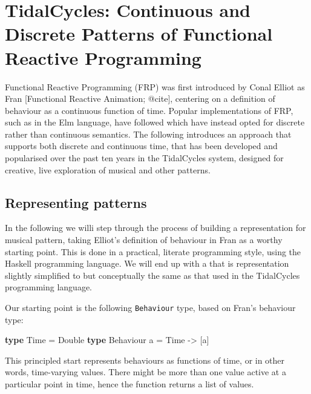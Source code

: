\documentclass[
]{article}
\author{}
\date{}
\newenvironment{Shaded}{}{}
\newcommand{\DataTypeTok}[1]{\textcolor[rgb]{0.56,0.13,0.00}{#1}}
\newcommand{\KeywordTok}[1]{\textcolor[rgb]{0.00,0.44,0.13}{\textbf{#1}}}
\newcommand{\NormalTok}[1]{#1}
\newcommand{\OtherTok}[1]{\textcolor[rgb]{0.00,0.44,0.13}{#1}}
\begin{document}
\section{TidalCycles: Continuous and Discrete Patterns of Functional
Reactive
Programming}\label{tidalcycles-continuous-and-discrete-patterns-of-functional-reactive-programming}

Functional Reactive Programming (FRP) was first introduced by Conal
Elliot as Fran {[}Functional Reactive Animation; @cite{]}, centering on
a definition of behaviour as a continuous function of time. Popular
implementations of FRP, such as in the Elm language, have followed which
have instead opted for discrete rather than continuous semantics. The
following introduces an approach that supports both discrete and
continuous time, that has been developed and popularised over the past
ten years in the TidalCycles system, designed for creative, live
exploration of musical and other patterns.

\subsection{Representing patterns}\label{representing-patterns}

In the following we willi step through the process of building a
representation for musical pattern, taking Elliot's definition of
behaviour in Fran as a worthy starting point. This is done in a
practical, literate programming style, using the Haskell programming
language. We will end up with a that is representation slightly
simplified to but conceptually the same as that used in the TidalCycles
programming language.

Our starting point is the following \texttt{Behaviour} type, based on
Fran's behaviour type:

\begin{Shaded}
\begin{Highlighting}[]
\KeywordTok{type} \DataTypeTok{Time} \OtherTok{=} \DataTypeTok{Double}
\KeywordTok{type} \DataTypeTok{Behaviour}\NormalTok{ a }\OtherTok{=} \DataTypeTok{Time} \OtherTok{{-}\textgreater{}}\NormalTok{ [a]}
\end{Highlighting}
\end{Shaded}

This principled start represents behaviours as functions of time, or in
other words, time-varying values. There might be more than one value
active at a particular point in time, hence the function returns a list
of values.
\end{document}
